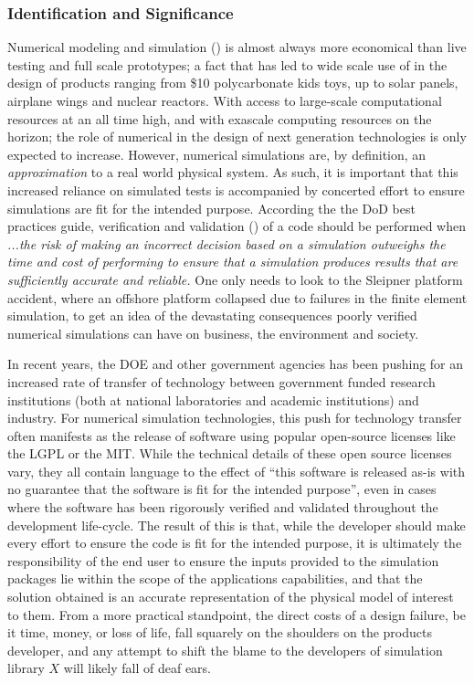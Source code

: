\subsubsection{Identification and Significance}
\label{intro}
Numerical modeling and simulation (\MS) is almost always more economical than live testing and full scale prototypes; a fact that has led to wide scale use of \MS in the design of products ranging from \$10 polycarbonate kids toys, up to solar panels, airplane wings and nuclear reactors. With access to large-scale computational resources at an all time high, and with exascale computing resources on the horizon; the role of numerical \MS in the design of next generation technologies is only expected to increase. However, numerical simulations are, by definition, an \emph{approximation} to a real world physical system. As such, it is important that this increased reliance on simulated tests is accompanied by concerted effort to ensure simulations are fit for the intended purpose.  According the the DoD best practices guide, verification and validation (\VV) of a code should be performed when  \emph{...the risk of making an incorrect decision based on a simulation outweighs the time and cost of performing \VVA to ensure that a simulation produces results that are sufficiently accurate and reliable.} One only needs to look to the Sleipner platform accident, where an offshore platform collapsed due to failures in the finite element simulation, to get an idea of the devastating consequences poorly verified numerical simulations can have on business, the environment and society.

In recent years, the DOE and other government agencies has been pushing for an increased rate of transfer of technology between government funded research institutions (both at national laboratories and academic institutions) and industry. For numerical simulation technologies, this push for technology transfer often manifests as the release of software using popular open-source licenses like the LGPL or the MIT. While the technical details of these open source licenses vary, they all contain language to the effect of ``this software is released as-is with no guarantee that the software is fit for the intended purpose'', even in cases where the software has been rigorously verified and validated throughout the development life-cycle. The result of this is that, while the developer should make every effort to ensure the code is fit for the intended purpose, it is ultimately the responsibility of the end user to ensure the inputs provided to the simulation packages lie within the scope of the applications capabilities, and that the solution obtained is an accurate representation of the physical model of interest to them. From a more practical standpoint, the direct costs of a design failure, be it time, money, or loss of life, fall squarely on the shoulders on the products developer, and any attempt to shift the blame to the developers of simulation library $X$ will likely fall of deaf ears.  

